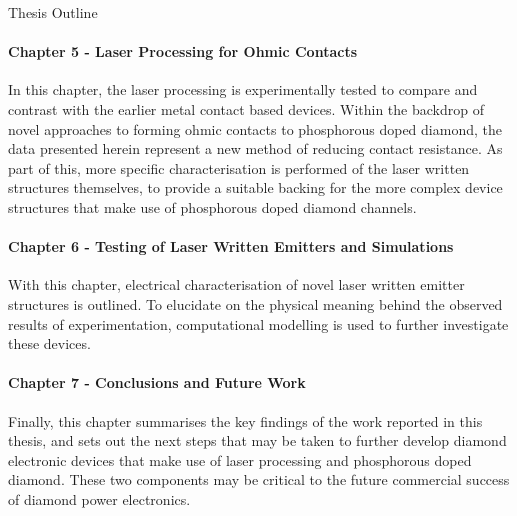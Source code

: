 \begin{refsection}
\begin{introduction}
\begin{section}{Thesis Outline}
{\paragraph{Chapter 5 - Laser Processing for Ohmic Contacts}
In this chapter, the laser processing is experimentally tested to compare and contrast with the earlier metal contact based devices. Within the backdrop of novel approaches to forming ohmic contacts to phosphorous doped diamond, the data presented herein represent a new method of reducing contact resistance. As part of this, more specific characterisation is performed of the laser written structures themselves, to provide a suitable backing for the more complex device structures that make use of phosphorous doped diamond channels.

\paragraph{Chapter 6 - Testing of Laser Written Emitters and Simulations}
With this chapter, electrical characterisation of novel laser written emitter structures is outlined. To elucidate on the physical meaning behind the observed results of experimentation, computational modelling is used to further investigate these devices.


\paragraph{Chapter 7 - Conclusions and Future Work}
Finally, this chapter summarises the key findings of the work reported in this thesis, and sets out the next steps that may be taken to further develop diamond electronic devices that make use of laser processing and phosphorous doped diamond. These two components may be critical to the future commercial success of diamond power electronics.
}
\end{section}

\end{introduction}

\printbibliography[heading=subbibliography]

\end{refsection}